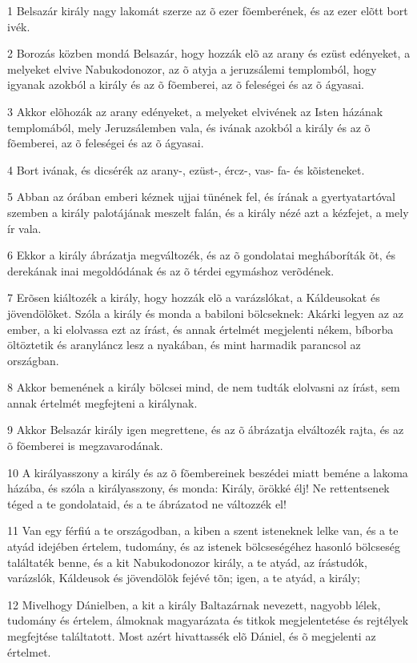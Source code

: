 \par 1 Belsazár király nagy lakomát szerze az õ ezer fõemberének, és az ezer elõtt bort ivék.
\par 2 Borozás közben mondá Belsazár, hogy hozzák elõ az arany és ezüst edényeket, a melyeket elvive Nabukodonozor, az õ atyja a jeruzsálemi templomból, hogy igyanak azokból a király és az õ fõemberei, az õ feleségei és az õ ágyasai.
\par 3 Akkor elõhozák az arany edényeket, a melyeket elvivének az Isten házának templomából, mely Jeruzsálemben vala, és ivának azokból a király és az õ fõemberei, az õ feleségei és az õ ágyasai.
\par 4 Bort ivának, és dicsérék az arany-, ezüst-, ércz-, vas- fa- és kõisteneket.
\par 5 Abban az órában emberi kéznek ujjai tünének fel, és írának a gyertyatartóval szemben a király palotájának meszelt falán, és a király nézé azt a kézfejet, a mely ír vala.
\par 6 Ekkor a király ábrázatja megváltozék, és az õ gondolatai megháboríták õt, és derekának inai megoldódának és az õ térdei egymáshoz verõdének.
\par 7 Erõsen kiáltozék a király, hogy hozzák elõ a varázslókat, a Káldeusokat és jövendölõket. Szóla a király és monda a babiloni bölcseknek: Akárki legyen az az ember, a ki elolvassa ezt az írást, és annak értelmét megjelenti nékem, bíborba öltöztetik és aranyláncz lesz a nyakában, és mint harmadik parancsol az országban.
\par 8 Akkor bemenének a király bölcsei mind, de nem tudták elolvasni az írást, sem annak értelmét megfejteni a királynak.
\par 9 Akkor Belsazár király igen megrettene, és az õ ábrázatja elváltozék rajta, és az õ fõemberei is megzavarodának.
\par 10 A királyasszony a király és az õ fõembereinek beszédei miatt beméne a lakoma házába, és szóla a királyasszony, és monda: Király, örökké élj! Ne rettentsenek téged a te gondolataid, és a te ábrázatod ne változzék el!
\par 11 Van egy férfiú a te országodban, a kiben a szent isteneknek lelke van, és a te atyád idejében értelem, tudomány, és az istenek bölcseségéhez hasonló bölcseség találtaték benne, és a kit Nabukodonozor király, a te  atyád, az írástudók, varázslók, Káldeusok és jövendölõk fejévé tõn; igen, a te atyád, a király;
\par 12 Mivelhogy Dánielben, a kit a király Baltazárnak nevezett, nagyobb lélek, tudomány és értelem, álmoknak magyarázata és titkok megjelentetése és rejtélyek megfejtése találtatott. Most azért hivattassék elõ Dániel, és õ megjelenti az értelmet.
